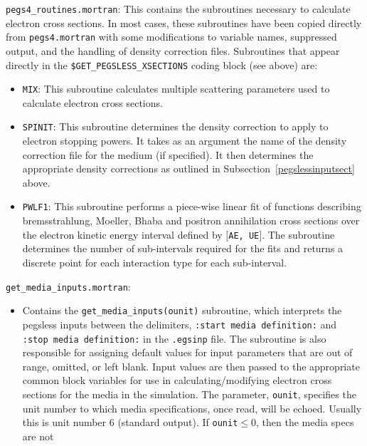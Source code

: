 \begin{description}
\begin{itemize}
\end{itemize}
\item{\tt pegs4\_routines.mortran}:  This contains the subroutines necessary to calculate electron cross sections.  In most
cases, these subroutines have been copied directly from {\tt pegs4.mortran} with some modifications to variable names, suppressed
output, and the handling of density correction files.  Subroutines that appear directly in the {\tt \$GET\_PEGSLESS\_XSECTIONS}
coding block (see above) are:
\begin{itemize}
\item {\tt MIX}: This subroutine calculates multiple scattering parameters used to calculate electron cross sections. 
\item {\tt SPINIT}: This subroutine determines the density correction to apply to electron stopping powers.  It takes as
an argument the name of the density correction file for the medium (if specified).  It then determines the appropriate
density corrections as outlined in Subsection~\ref{pegslessinputsect} above.
\item {\tt PWLF1}: This subroutine performs a piece-wise linear fit of functions describing bremsstrahlung, Moeller, Bhaba
and positron annihilation cross sections over the electron kinetic energy interval defined by $[${\tt AE, UE}$]$.  The subroutine 
determines the number of sub-intervals required for the fits and returns a discrete point for each interaction type for
each sub-interval.
\end{itemize}
\item {\tt get\_media\_inputs.mortran}: 
\begin{itemize} 
\item Contains the {\tt get\_media\_inputs(ounit)} subroutine, which interprets 
the pegsless inputs between the delimiters, {\tt :start media definition:} and {\tt :stop media definition:}
in the {\tt .egsinp} file.  The subroutine is also responsible for assigning default values for input parameters
that are out of range, omitted, or left blank.  Input values are then passed to the appropriate common block
variables for use in calculating/modifying electron cross sections for the media in the simulation. The parameter, 
{\tt ounit}, specifies the unit number to which media specifications, once read, will 
be echoed.  Usually this is unit number 6 (standard output).  If {\tt ounit}$\leq$0, then the media specs are not

\end{itemize}
\end{description}

